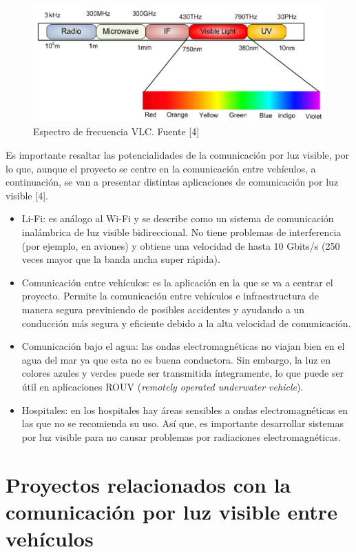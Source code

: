 \begin{figure}[ht]
    \centering
    \includegraphics[scale=0.70]{./figuras/espectro.png}
    \caption{\small{Espectro de frecuencia VLC. Fuente [4]}}
    \label{espectro}%
\end{figure}
\newpage
Es importante resaltar las potencialidades de la comunicación por luz visible, por lo que, aunque el proyecto se centre en la comunicación entre vehículos, a continuación, se van a presentar distintas aplicaciones de comunicación por luz visible [4].

\begin{itemize}
    \item Li-Fi: es análogo al Wi-Fi y se describe como un sistema de comunicación inalámbrica de luz visible bidireccional. No tiene problemas de interferencia (por ejemplo, en aviones) y obtiene una velocidad de hasta 10 Gbits/s (250 veces mayor que la banda ancha super rápida).
    \item Comunicación entre vehículos: es la aplicación en la que se va a centrar el proyecto. Permite la comunicación entre vehículos e infraestructura de manera segura previniendo de posibles accidentes y ayudando a un conducción más segura y eficiente debido a la alta velocidad de comunicación.
    \item Comunicación bajo el agua: las ondas electromagnéticas no viajan bien en el agua del mar ya que esta no es buena conductora. Sin embargo, la luz en colores azules y verdes puede ser transmitida íntegramente, lo que puede ser útil en aplicaciones ROUV (\textit{remotely operated underwater vehicle}).
    \item Hospitales: en los hospitales hay áreas sensibles a ondas electromagnéticas en las que no se recomienda su uso. Así que, es importante desarrollar sistemas por luz visible para no causar problemas por radiaciones electromagnéticas.
\end{itemize}

\section{Proyectos relacionados con la comunicación por luz visible entre vehículos}

